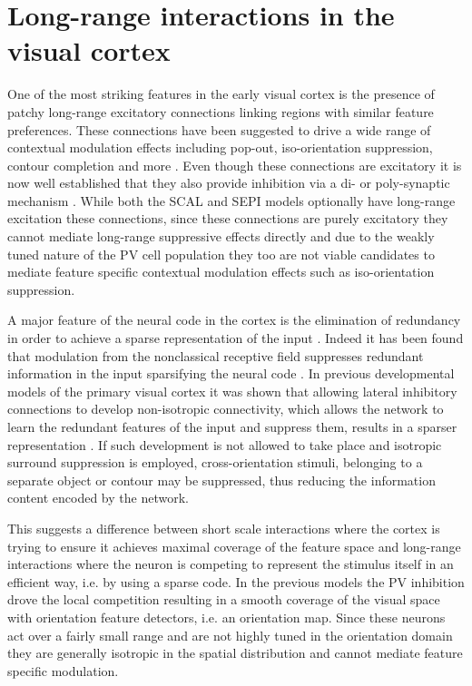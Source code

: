 \chapter{Long-range interactions in the visual cortex}

One of the most striking features in the early visual cortex is the
presence of patchy long-range excitatory connections linking regions
with similar feature preferences. These connections have been
suggested to drive a wide range of contextual modulation effects
including pop-out, iso-orientation suppression, contour completion and
more \citep{Gilbert1983, Hirsch1991, McGuire1991, Grinvald1994,
  Fitzpatrick2000, Hupe2001, Stettler2002}. Even though these
connections are excitatory it is now well established that they also
provide inhibition via a di- or poly-synaptic mechanism
\citep{Weliky1995}. While both the SCAL and SEPI models optionally
have long-range excitation these connections, since these connections
are purely excitatory they cannot mediate long-range suppressive
effects directly and due to the weakly tuned nature of the PV cell
population they too are not viable candidates to mediate feature
specific contextual modulation effects such as iso-orientation
suppression.

A major feature of the neural code in the cortex is the elimination of
redundancy in order to achieve a sparse representation of the input
\citep{Olshausen1996}. Indeed it has been found that modulation from
the nonclassical receptive field suppresses redundant information in
the input sparsifying the neural code \citep{Vinje2000}. In previous
developmental models of the primary visual cortex it was shown that
allowing lateral inhibitory connections to develop non-isotropic
connectivity, which allows the network to learn the redundant features
of the input and suppress them, results in a sparser representation
\citep{Miikkulainen2005b}. If such development is not allowed to take
place and isotropic surround suppression is employed,
cross-orientation stimuli, belonging to a separate object or contour
may be suppressed, thus reducing the information content encoded by
the network.

This suggests a difference between short scale interactions where the
cortex is trying to ensure it achieves maximal coverage of the feature
space and long-range interactions where the neuron is competing to
represent the stimulus itself in an efficient way, i.e. by using a
sparse code. In the previous models the PV inhibition drove the local
competition resulting in a smooth coverage of the visual space with
orientation feature detectors, i.e. an orientation map. Since these
neurons act over a fairly small range and are not highly tuned in the
orientation domain they are generally isotropic in the spatial
distribution and cannot mediate feature specific modulation.

